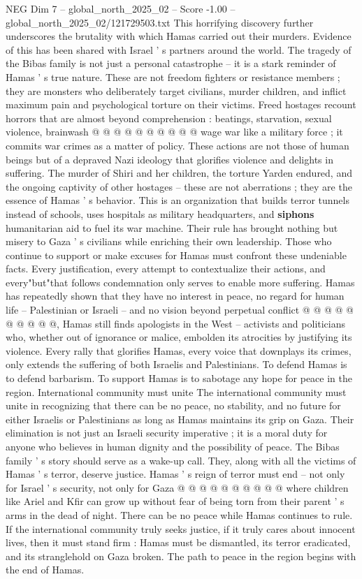 \begin{textsample}{NEG Dim 7 – global\_north\_2025\_02 – Score -1.00 – global\_north\_2025\_02/121729503.txt}
This horrifying discovery further underscores the brutality with which Hamas carried out their murders.
Evidence of this has been shared with Israel ' s partners around the world.
The tragedy of the Bibas family is not just a personal catastrophe -- it is a stark reminder of Hamas ' s true nature.
These are not freedom fighters or resistance members ; they are monsters who deliberately target civilians, murder children, and inflict maximum pain and psychological torture on their victims.
Freed hostages recount horrors that are almost beyond comprehension : beatings, starvation, sexual violence, brainwash @ @ @ @ @ @ @ @ @ @ wage war like a military force ; it commits war crimes as a matter of policy.
These actions are not those of human beings but of a depraved Nazi ideology that glorifies violence and delights in suffering.
The murder of Shiri and her children, the torture Yarden endured, and the ongoing captivity of other hostages -- these are not aberrations ; they are the essence of Hamas ' s behavior.
This is an organization that builds terror tunnels instead of schools, uses hospitals as military headquarters, and \textbf{siphons} humanitarian aid to fuel its war machine.
Their rule has brought nothing but misery to Gaza ' s civilians while enriching their own leadership.
Those who continue to support or make excuses for Hamas must confront these undeniable facts.
Every justification, every attempt to contextualize their actions, and every"but"that follows condemnation only serves to enable more suffering.
Hamas has repeatedly shown that they have no interest in peace, no regard for human life -- Palestinian or Israeli -- and no vision beyond perpetual conflict @ @ @ @ @ @ @ @ @ @, Hamas still finds apologists in the West -- activists and politicians who, whether out of ignorance or malice, embolden its atrocities by justifying its violence.
Every rally that glorifies Hamas, every voice that downplays its crimes, only extends the suffering of both Israelis and Palestinians.
To defend Hamas is to defend barbarism.
To support Hamas is to sabotage any hope for peace in the region.
International community must unite The international community must unite in recognizing that there can be no peace, no stability, and no future for either Israelis or Palestinians as long as Hamas maintains its grip on Gaza.
Their elimination is not just an Israeli security imperative ; it is a moral duty for anyone who believes in human dignity and the possibility of peace.
The Bibas family ' s story should serve as a wake-up call.
They, along with all the victims of Hamas ' s terror, deserve justice.
Hamas ' s reign of terror must end -- not only for Israel ' s security, not only for Gaza @ @ @ @ @ @ @ @ @ @ where children like Ariel and Kfir can grow up without fear of being torn from their parent ' s arms in the dead of night.
There can be no peace while Hamas continues to rule.
If the international community truly seeks justice, if it truly cares about innocent lives, then it must stand firm : Hamas must be dismantled, its terror eradicated, and its stranglehold on Gaza broken.
The path to peace in the region begins with the end of Hamas.

\end{textsample}
